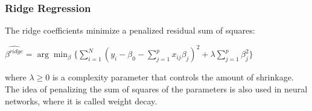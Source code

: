 \documentclass[11pt]{article}
\begin{document}
\subsubsection{Ridge Regression}
\label{sec:org9201448}

The ridge coefficients minimize a penalized residual sum of squares:

\(\hat{\beta^{ridge}} = \arg \min_\beta \{\sum_{i=1}^N(y_i - \beta_0 - \sum_{j=1}^p x_{ij} \beta_j)^2 + \lambda \sum_{j=1}^p \beta_j^2\}\)

where \(\lambda \geq 0\) is a complexity parameter that controls the amount of shrinkage. The idea of penalizing the sum of squares of the parameters is also used in neural networks, where it is called weight decay. 
\end{document}
